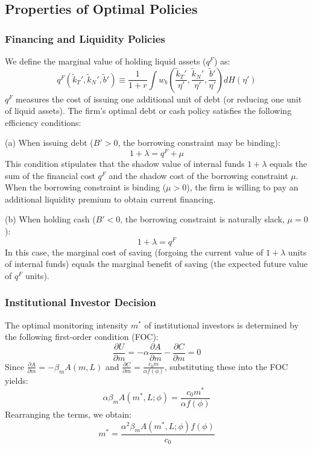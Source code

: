 \documentclass[12pt,a4paper]{article}
\begin{document}
\subsection{Properties of Optimal Policies}

\subsubsection{Financing and Liquidity Policies}
We define the marginal value of holding liquid assets ($q^F$) as:
\begin{equation}
q^F(\tilde{k}_T', \tilde{k}_N', \tilde{b}') \equiv \frac{1}{1+r} \int w_b \left( \frac{\tilde{k}_T'}{\eta'}, \frac{\tilde{k}_N'}{\eta'}, \frac{\tilde{b}'}{\eta'} \right) dH(\eta')
\end{equation}
$q^F$ measures the cost of issuing one additional unit of debt (or reducing one unit of liquid assets). The firm's optimal debt or cash policy satisfies the following efficiency conditions:

(a) When issuing debt ($B' > 0$, the borrowing constraint may be binding):
\begin{equation}
1 + \lambda = q^F + \mu
\end{equation}
This condition stipulates that the shadow value of internal funds $1 + \lambda$ equals the sum of the financial cost $q^F$ and the shadow cost of the borrowing constraint $\mu$. When the borrowing constraint is binding ($\mu > 0$), the firm is willing to pay an additional liquidity premium to obtain current financing.

(b) When holding cash ($B' < 0$, the borrowing constraint is naturally slack, $\mu = 0$):
\begin{equation}
1 + \lambda = q^F
\end{equation}
In this case, the marginal cost of saving (forgoing the current value of $1 + \lambda$ units of internal funds) equals the marginal benefit of saving (the expected future value of $q^F$ units).

\subsubsection{Institutional Investor Decision}
The optimal monitoring intensity $m^*$ of institutional investors is determined by the following first-order condition (FOC):
\begin{equation}
\frac{\partial U}{\partial m} = -\alpha \frac{\partial A}{\partial m} - \frac{\partial C}{\partial m} = 0
\end{equation}
Since $\frac{\partial A}{\partial m} = -\beta_m A(m, L)$ and $\frac{\partial C}{\partial m} = \frac{c_0 m}{\alpha f(\phi)}$, substituting these into the FOC yields:
\begin{equation}
\alpha \beta_m A(m^*, L; \phi) = \frac{c_0 m^*}{\alpha f(\phi)}
\end{equation}
Rearranging the terms, we obtain:
\begin{equation}
m^* = \frac{\alpha^2 \beta_m A(m^*, L; \phi) f(\phi)}{c_0}
\end{equation}
\end{document}
